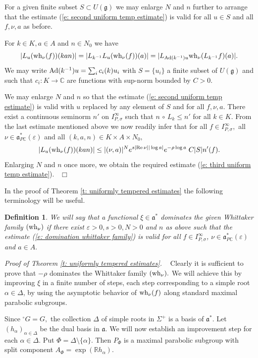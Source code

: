 \documentclass[12pt,a4paper]{article}
\newtheorem{Defi}[Thm]{Definition}
\newenvironment{defi}[0]{\begin{Defi}\noindent\rm}%
{\end{Defi}}
\def\qed{~\hfill\hbox{$\Box$}\medbreak}
\def\msy#1{{\mathbb #1}}
\def\C{{\msy C}}
\def\R{{\msy R}}
\def\ga{\alpha}
\def\ge{\varepsilon}
\def\gs{\sigma}
\def\gD{\Delta}
\def\gS{\Sigma}
\def\got#1{\mathfrak #1}
\def\fa{{\got a}}
\def\fg{{\got g}}
\def\to{\rightarrow}
\def\Re{{\rm Re}\,}
\def\Ad{{\rm Ad}}
\def\after{\,{\scriptstyle\circ}\,}
\def\iC{{\scriptscriptstyle \C}}
\numberwithin{Thm}{section}
\numberwithin{equation}{section}
\def\faPdc{{\fa_{P\iC}^*}}
\numberwithin{equation}{section}
\def\fad{{\fa^*}}
\def\faPdc{\fa_{P\iC}^*}
\def\snorm{n}
\def\IPgs{I_{P,\gs}^\infty}
\def\wh{{\rm wh}}
\def\xxi{\xi}
\begin{document}
For a given finite subset $S\subset U(\fg)$ we may enlarge $N$ and $n$ further to arrange that
the estimate (\ref{e: second uniform temp estimate}) is valid for all $u \in S$ and all 
$f,\nu, a$ as before.

For  $k\in K, a\in A$ and $n \in N_0$ we have
$$ 
|L_u(\wh_\nu(f))(kan)| = |L_{k^{-1}} L_u (\wh_\nu(f)) (a)| = | L_{\Ad(k^{-1})u } \wh_\nu(L_{k^{-1}}f )(a)|.
$$ 
We may write $\Ad(k^{-1}) u = \sum_i c_i(k) u_i$ with $S=\{u_i\}$ a finite subset of $U(\fg)$ 
and such that $c_i: K \to \C$ are functions with sup-norm bounded by $C>0.$ 

We may enlarge $N$ and $n$ so that the estimate (\ref{e: second uniform temp estimate}) is valid with 
$u$ replaced by any element of $S$ and for all $f,\nu, a.$ 
There exist a continuous seminorm $\snorm'$ on $\IPgs$ such
that $\snorm  \after L_k \leq \snorm'$ for all $k \in K.$ From the last estimate mentioned above we 
now readily infer that for all $f \in \IPgs,$ all $\nu \in \faPdc(\ge)$ and all $(k,a,n) \in K\times A\times N_0,$
$$ 
|L_u(\wh_\nu(f))(kan)| \leq |(\nu, a)|^{N} e^{s |\Re \nu||\log a|} e^{- \rho \log a} \;C|S|\snorm'(f).
$$  
Enlarging $N$ and $n$ once more, we obtain the required estimate (\ref{e: third uniform temp estimate}).
\qed

In the proof of Theorem \ref{t: uniformly tempered estimates} the following terminology will
be useful.

\begin{defi}\label{d: domination}
We will say that a functional $\xxi \in \fad$ dominates the
given Whittaker family $ (\wh_\nu)$ if there exist $\ge >0, s> 0, N>0$ and 
$\snorm$ as above such that the estimate (\ref{e: domination whittaker family}) is valid
for all $f \in \IPgs$,  $\nu \in \faPdc(\ge)$ and $a \in A.$
\end{defi}

{\em Proof of Theorem \ref{t: uniformly tempered estimates}. \ }
Clearly it is sufficient 
to prove that $-\rho$ dominates the Whittaker family $(\wh_\nu).$  
We will achieve this by improving $\xxi$ in a finite number
of steps, each step corresponding to a simple root $\ga \in \gD$, by using the asymptotic behavior of $\wh_\nu(f)$ along standard maximal parabolic subgroups.

Since ${}^\circ G = G,$ the collection $\gD$ of simple roots in $\gS^+$ is a basis of $\fad.$ 
Let $(h_\ga)_{\ga \in \gD}$ be the dual basis in $\fa.$ 
We will now establish an improvement step for each $\ga \in \gD.$ Put 
$\Phi = \gD\setminus \{\ga\}.$ Then $P_\Phi$ is a maximal parabolic subgroup with
 split component $A_\Phi = \exp(\R h_\ga).$
  
\end{document}
